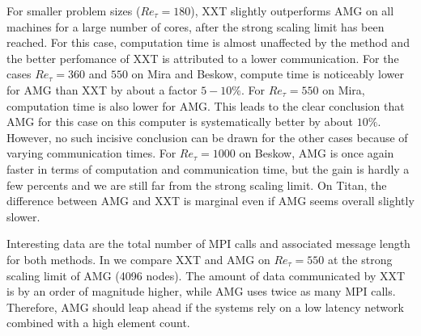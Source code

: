\documentclass{sig-alternate}
\begin{document}
For smaller problem sizes ($Re_{\tau}=180$), XXT slightly outperforms AMG on all machines
for a large number of cores, after the strong scaling limit has been reached. 
For this case, computation time is almost unaffected by the method and the better perfomance
of XXT is attributed to a lower communication. For the cases $Re_{\tau}=360$ and 
$550$ on Mira and Beskow, compute time is noticeably lower for AMG than XXT by
about a factor $5-10\%$. For $Re_{\tau}=550$ on Mira, computation time is also lower
for AMG. This leads to the clear conclusion that AMG for this case on this computer
is systematically better by about $10\%$. However, no such incisive conclusion can be drawn for the other
cases because of varying communication times. For $Re_{\tau}=1000$ on Beskow, 
AMG is once again faster in terms of computation and communication time, but the 
gain is hardly a few percents and we are still far from the strong scaling limit.
On Titan, the difference between AMG and XXT is marginal even if AMG seems overall
slightly slower.

Interesting data are the total number of MPI calls and associated message length
for both methods. In  we compare XXT and AMG on $Re_{\tau} = 550$ 
at the strong scaling limit of AMG (4096 nodes). The amount of data communicated 
by XXT is by an order of magnitude higher, while AMG uses twice as many MPI calls. 
Therefore, AMG should leap ahead if the systems rely on a low latency network 
combined with a high element count.
\end{document}

